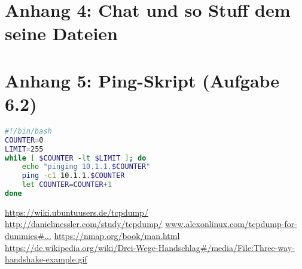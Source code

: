 \documentclass[twoside]{article}
\begin{document}
\section*{Anhang 4: Chat und so Stuff dem seine Dateien}


\section*{Anhang 5: Ping-Skript (Aufgabe 6.2)}
\begin{lstlisting}[language=Bash]
#!/bin/bash
COUNTER=0
LIMIT=255
while [ $COUNTER -lt $LIMIT ]; do
	echo "pinging 10.1.1.$COUNTER"
	ping -c1 10.1.1.$COUNTER
	let COUNTER=COUNTER+1
done
\end{lstlisting}

\begin{thebibliography}{1}
		\url{https://wiki.ubuntuusers.de/tcpdump/}
		\url{http://danielmessler.com/study/tcpdump/}
			\url{www.alexonlinux.com/tcpdump-for-dummies\#...}
			\url{https://nmap.org/book/man.html}
			\url{https://de.wikipedia.org/wiki/Drei-Wege-Handschlag#/media/File:Three-way-handshake-example.gif}
\end{thebibliography}
\end{document}
